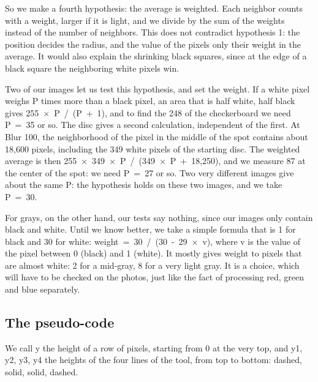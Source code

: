 \documentclass[10pt,a4paper]{article}
\begin{document}
So we make a fourth hypothesis: the average is weighted. Each neighbor counts with a weight, larger if it is light, and we divide by the sum of the weights instead of the number of neighbors. This does not contradict hypothesis 1: the position decides the radius, and the value of the pixels only their weight in the average. It would also explain the shrinking black squares, since at the edge of a black square the neighboring white pixels win.

Two of our images let us test this hypothesis, and set the weight. If a white pixel weighs P times more than a black pixel, an area that is half white, half black gives \mbox{255 × P / (P + 1)}, and to find the 248 of the checkerboard we need \mbox{P = 35} or so. The disc gives a second calculation, independent of the first. At Blur 100, the neighborhood of the pixel in the middle of the spot contains about 18,600 pixels, including the 349 white pixels of the starting disc. The weighted average is then \mbox{255 × 349 × P / (349 × P + 18,250)}, and we measure 87 at the center of the spot: we need \mbox{P = 27} or so. Two very different images give about the same P: the hypothesis holds on these two images, and we take \mbox{P = 30}.

For grays, on the other hand, our tests say nothing, since our images only contain black and white. Until we know better, we take a simple formula that is 1 for black and 30 for white: \mbox{weight = 30 / (30 - 29 × v)}, where v is the value of the pixel between 0 (black) and 1 (white). It mostly gives weight to pixels that are almost white: 2 for a mid-gray, 8 for a very light gray. It is a choice, which will have to be checked on the photos, just like the fact of processing red, green and blue separately.

\subsection*{The pseudo-code}

We call y the height of a row of pixels, starting from 0 at the very top, and y1, y2, y3, y4 the heights of the four lines of the tool, from top to bottom: dashed, solid, solid, dashed.
\end{document}

